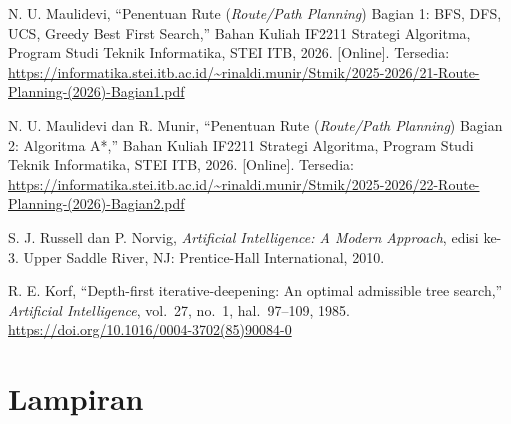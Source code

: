 \documentclass[12pt,a4paper]{article}
\begin{document}
\begin{enumerate}[label={[\arabic*]}, leftmargin=2.5em, itemsep=0.3em]

\item N. U. Maulidevi, ``Penentuan Rute (\textit{Route/Path Planning}) Bagian 1:
      BFS, DFS, UCS, Greedy Best First Search,''
      Bahan Kuliah IF2211 Strategi Algoritma,
      Program Studi Teknik Informatika, STEI ITB, 2026.
      [Online]. Tersedia:
      \url{https://informatika.stei.itb.ac.id/~rinaldi.munir/Stmik/2025-2026/21-Route-Planning-(2026)-Bagian1.pdf}

\item N. U. Maulidevi dan R. Munir, ``Penentuan Rute (\textit{Route/Path Planning}) Bagian 2:
      Algoritma A*,''
      Bahan Kuliah IF2211 Strategi Algoritma,
      Program Studi Teknik Informatika, STEI ITB, 2026.
      [Online]. Tersedia:
      \url{https://informatika.stei.itb.ac.id/~rinaldi.munir/Stmik/2025-2026/22-Route-Planning-(2026)-Bagian2.pdf}

\item S. J. Russell dan P. Norvig, \textit{Artificial Intelligence: A Modern Approach},
      edisi ke-3. Upper Saddle River, NJ: Prentice-Hall International, 2010.

\item R. E. Korf, ``Depth-first iterative-deepening: An optimal admissible tree search,''
      \textit{Artificial Intelligence}, vol.~27, no.~1, hal.~97--109, 1985.
      \url{https://doi.org/10.1016/0004-3702(85)90084-0}

\end{enumerate}

\newpage
\section*{Lampiran}
\end{document}

